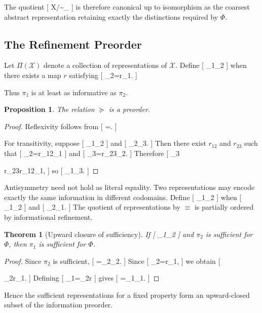 \documentclass[11pt]{article}
\newtheorem{theorem}{Theorem} \newtheorem{proposition}{Proposition} \newtheorem{lemma}{Lemma} \newtheorem{corollary}{Corollary} \newtheorem{definition}{Definition} \newtheorem{remark}{Remark}
\begin{document}
The quotient
[
\mathcal X/{\sim_\Phi}
]
is therefore canonical up to isomorphism as the coarsest abstract representation retaining exactly the distinctions required by $\Phi$.

\subsection{The Refinement Preorder}

Let $\Pi(\mathcal X)$ denote a collection of representations of $\mathcal X$. Define
[
\pi_1\succeq\pi_2
]
when there exists a map $r$ satisfying
[
\pi_2=r\circ\pi_1.
]

Thus $\pi_1$ is at least as informative as $\pi_2$.

\begin{proposition}
The relation $\succeq$ is a preorder.
\end{proposition}

\begin{proof}
Reflexivity follows from
[
\pi=\circ\pi.
]

For transitivity, suppose
[
\pi_1\succeq\pi_2
]
and
[
\pi_2\succeq\pi_3.
]
Then there exist $r_{12}$ and $r_{23}$ such that
[
\pi_2=r_{12}\circ\pi_1
]
and
[
\pi_3=r_{23}\circ\pi_2.
]
Therefore
[
\pi_3

r_{23}\circ r_{12}\circ\pi_1,
]
so
[
\pi_1\succeq\pi_3.
]
\end{proof}

Antisymmetry need not hold as literal equality. Two representations may encode exactly the same information in different codomains. Define
[
\pi_1\equiv\pi_2
]
when
[
\pi_1\succeq\pi_2
]
and
[
\pi_2\succeq\pi_1.
]
The quotient of representations by $\equiv$ is partially ordered by informational refinement.

\begin{theorem}[Upward closure of sufficiency]
If
[
\pi_1\succeq\pi_2
]
and $\pi_2$ is sufficient for $\Phi$, then $\pi_1$ is sufficient for $\Phi$.
\end{theorem}

\begin{proof}
Since $\pi_2$ is sufficient,
[
\Phi=\widehat{\Phi}_2\circ\pi_2.
]
Since
[
\pi_2=r\circ\pi_1,
]
we obtain
[
\Phi

\widehat{\Phi}_2\circ r\circ\pi_1.
]
Defining
[
\widehat{\Phi}_1=\widehat{\Phi}_2\circ r
]
gives
[
\Phi=\widehat{\Phi}_1\circ\pi_1.
]
\end{proof}

Hence the sufficient representations for a fixed property form an upward-closed subset of the information preorder.
\end{document}
